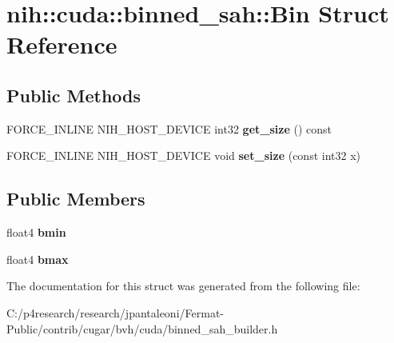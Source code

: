 \hypertarget{structnih_1_1cuda_1_1binned__sah_1_1_bin}{}\section{nih\+:\+:cuda\+:\+:binned\+\_\+sah\+:\+:Bin Struct Reference}
\label{structnih_1_1cuda_1_1binned__sah_1_1_bin}
\subsection*{Public Methods}
\begin{DoxyCompactItemize}
\item 
\mbox{\label{structnih_1_1cuda_1_1binned__sah_1_1_bin_a4ca9072983cbb28f8f009454c5eeb67c}} 
F\+O\+R\+C\+E\+\_\+\+I\+N\+L\+I\+NE N\+I\+H\+\_\+\+H\+O\+S\+T\+\_\+\+D\+E\+V\+I\+CE int32 {\bfseries get\+\_\+size} () const
\item 
\mbox{\label{structnih_1_1cuda_1_1binned__sah_1_1_bin_a698ed11fa1cd7baef783268aa8a793dc}} 
F\+O\+R\+C\+E\+\_\+\+I\+N\+L\+I\+NE N\+I\+H\+\_\+\+H\+O\+S\+T\+\_\+\+D\+E\+V\+I\+CE void {\bfseries set\+\_\+size} (const int32 x)
\end{DoxyCompactItemize}
\subsection*{Public Members}
\begin{DoxyCompactItemize}
\item 
\mbox{\label{structnih_1_1cuda_1_1binned__sah_1_1_bin_acc1ce983f35d7f63080e024e0ce6ada2}} 
float4 {\bfseries bmin}
\item 
\mbox{\label{structnih_1_1cuda_1_1binned__sah_1_1_bin_a81e938dea222b0f3dc61dbe76d9fd770}} 
float4 {\bfseries bmax}
\end{DoxyCompactItemize}


The documentation for this struct was generated from the following file\+:\begin{DoxyCompactItemize}
\item 
C\+:/p4research/research/jpantaleoni/\+Fermat-\/\+Public/contrib/cugar/bvh/cuda/binned\+\_\+sah\+\_\+builder.\+h\end{DoxyCompactItemize}
